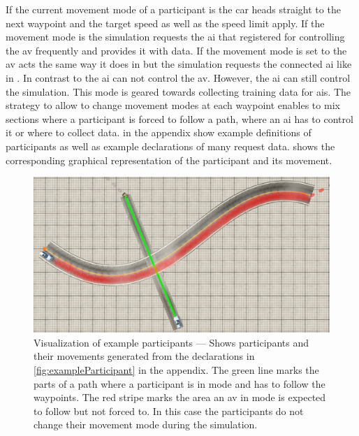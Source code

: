 If the current movement mode of a participant is \mmmanual{} the car heads straight to the next waypoint and the target speed as well as the speed limit apply.
If the movement mode is \mmautonomous{} the simulation requests the \gls{ai} that registered for controlling the \gls{av} frequently and provides it with data.
If the movement mode is set to \mmtraining{} the \gls{av} acts the same way it does in \mmmanual{} but the simulation requests the connected \gls{ai} like in \mmautonomous{}.
In contrast to \mmautonomous{} the \gls{ai} can not control the \gls{av}.
However, the \gls{ai} can still control the simulation.
This mode is geared towards collecting training data for \glspl{ai}.
The strategy to allow to change movement modes at each waypoint enables to mix sections where a participant is forced to follow a path, where an \gls{ai} has to control it or where to collect data.
 in the appendix show example definitions of participants as well as example declarations of many request data.
 shows the corresponding graphical representation of the participant and its movement.
\begin{figure}
    \centering
    \includegraphics[width=.9\linewidth]{pictures/2019-08-15_ParticipantMovements.png} %
    \medskip
    \caption{%
        Visualization of example participants --- Shows participants and their movements generated from the declarations in \cref{fig:exampleParticipant} in the appendix.
        The green line marks the parts of a path where a participant is in \mmmanual{} mode and has to follow the waypoints.
        The red stripe marks the area an \gls{av} in \mmautonomous{} mode is expected to follow but not forced to.
        In this case the participants do not change their movement mode during the simulation.
    }\label{fig:exampleParticipantVis}
\end{figure}

